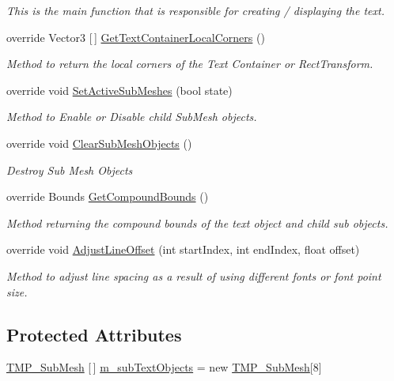 \begin{DoxyCompactItemize}
\begin{DoxyCompactList}\small\item\em This is the main function that is responsible for creating / displaying the text. \end{DoxyCompactList}\item 
override Vector3 \mbox{[}$\,$\mbox{]} \mbox{\hyperlink{class_t_m_pro_1_1_text_mesh_pro_ab19c47a7d65e5e1201978568ed1af0d5}{Get\+Text\+Container\+Local\+Corners}} ()
\begin{DoxyCompactList}\small\item\em Method to return the local corners of the Text Container or Rect\+Transform. \end{DoxyCompactList}\item 
override void \mbox{\hyperlink{class_t_m_pro_1_1_text_mesh_pro_a47054b0daf19b59c438eb804917997ab}{Set\+Active\+Sub\+Meshes}} (bool state)
\begin{DoxyCompactList}\small\item\em Method to Enable or Disable child Sub\+Mesh objects. \end{DoxyCompactList}\item 
override void \mbox{\hyperlink{class_t_m_pro_1_1_text_mesh_pro_a7b6baf8afa783ff9a77d62fffe4073a6}{Clear\+Sub\+Mesh\+Objects}} ()
\begin{DoxyCompactList}\small\item\em Destroy Sub Mesh Objects \end{DoxyCompactList}\item 
override Bounds \mbox{\hyperlink{class_t_m_pro_1_1_text_mesh_pro_ad718ed443f72e498e2fa64a1f794360d}{Get\+Compound\+Bounds}} ()
\begin{DoxyCompactList}\small\item\em Method returning the compound bounds of the text object and child sub objects. \end{DoxyCompactList}\item 
override void \mbox{\hyperlink{class_t_m_pro_1_1_text_mesh_pro_a20da6ec1df3a80e5bdb11078b0175392}{Adjust\+Line\+Offset}} (int start\+Index, int end\+Index, float offset)
\begin{DoxyCompactList}\small\item\em Method to adjust line spacing as a result of using different fonts or font point size. \end{DoxyCompactList}\end{DoxyCompactItemize}
\subsection*{Protected Attributes}
\begin{DoxyCompactItemize}
\item 
\mbox{\hyperlink{class_t_m_pro_1_1_t_m_p___sub_mesh}{T\+M\+P\+\_\+\+Sub\+Mesh}} \mbox{[}$\,$\mbox{]} \mbox{\hyperlink{class_t_m_pro_1_1_text_mesh_pro_a0723edfff2fc4ff3950f8258c35ead91}{m\+\_\+sub\+Text\+Objects}} = new \mbox{\hyperlink{class_t_m_pro_1_1_t_m_p___sub_mesh}{T\+M\+P\+\_\+\+Sub\+Mesh}}\mbox{[}8\mbox{]}
\end{DoxyCompactItemize}
